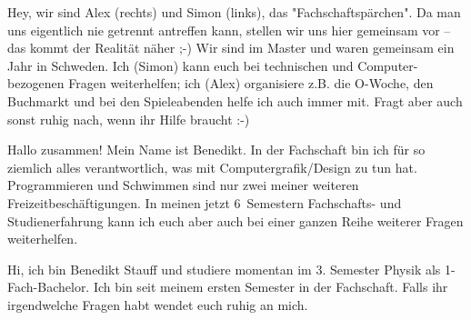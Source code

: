 \begin{multicols*}{2}

{%

Hey,
wir sind Alex (rechts) und Simon (links), das "Fachschaftspärchen". Da 
man uns eigentlich nie getrennt antreffen kann, stellen wir uns hier 
gemeinsam vor -- das kommt der Realität näher ;-)
Wir sind im Master und waren gemeinsam ein Jahr in Schweden. Ich (Simon) 
kann euch bei technischen und Computer-bezogenen Fragen weiterhelfen; 
ich (Alex) organisiere z.B. die O-Woche, den Buchmarkt und bei den 
Spieleabenden helfe ich auch immer mit. Fragt aber auch sonst ruhig 
nach, wenn ihr Hilfe braucht :-)
}
	
{Hallo zusammen! Mein Name ist Benedikt. In der Fachschaft bin ich für so ziemlich alles verantwortlich, was mit Computergrafik/Design zu tun hat. Programmieren und Schwimmen sind nur zwei meiner weiteren Freizeitbeschäftigungen. In meinen jetzt 6~Semestern Fachschafts- und Studienerfahrung kann ich euch aber auch bei einer ganzen Reihe weiterer Fragen weiterhelfen.}
	
{Hi, ich bin Benedikt Stauff und studiere momentan im 3. Semester Physik als 1-Fach-Bachelor. 
Ich bin seit meinem ersten Semester in der Fachschaft. Falls ihr irgendwelche Fragen habt wendet euch ruhig an mich.}


\end{multicols*}
